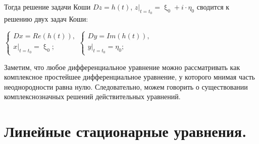 \documentclass[a4paper, 12pt]{report}
\renewcommand{\xi}{\upxi}
\begin{document}
	Тогда решение задачи Коши $Dz = h(t)$, $z|_{t=t_0} = \xi_0 + i\cdot \eta_0$ сводится к решению двух задач Коши:\begin{center}
		$\begin{cases}
			Dx = Re (h(t)),\\
			x|_{t=t_0} = \xi_0;
		\end{cases}$\qquad $\begin{cases}
			Dy = Im (h(t)),\\
			y|_{t=t_0} = \eta_0;
		\end{cases}$
	\end{center}
	Заметим, что любое дифференциальное уравнение можно рассматривать как комплексное простейшее дифференциальное уравнение, у которого мнимая часть неоднородности равна нулю. Следовательно, можем говорить о существовании комплекснозначных решений действительных уравнений.
	\chapter{Линейные стационарные уравнения.}
\end{document}
